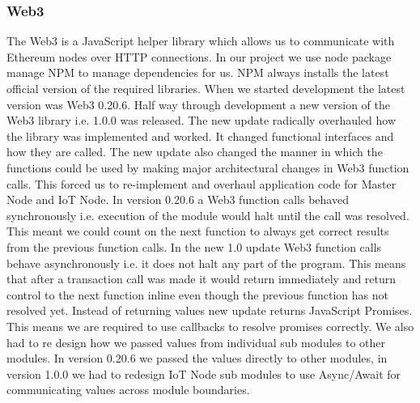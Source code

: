 \subsubsection{Web3}
The Web3 is a JavaScript helper library which allows us to communicate with Ethereum nodes over HTTP connections. In our project we use node package manage NPM to manage dependencies for us. NPM always installs the latest official version of the required libraries. When we started development the latest version was Web3 0.20.6. Half way through development a new version of the Web3 library i.e. 1.0.0 was released. The new update radically overhauled how the library was implemented and worked. It changed functional interfaces and how they are called. The new update also changed the manner in which the functions could be used by making major architectural changes in Web3 function calls. This forced us to re-implement and overhaul application code for Master Node and IoT Node. In version 0.20.6 a Web3 function calls behaved synchronously i.e. execution of the module would halt until the call was resolved. This meant we could count on the next function to always get correct results from the previous function calls. In the new 1.0 update Web3 function calls behave asynchronously i.e. it does not halt any part of the program. This means that after a transaction call was made it would return immediately and return control to the next function inline even though the previous function has not resolved yet. Instead of returning values new update returns JavaScript Promises. This means we are required to use callbacks to resolve promises correctly. We also had to re design how we passed values from individual sub modules to other modules. In version 0.20.6 we passed the values directly to other modules, in version 1.0.0 we had to redesign IoT Node sub modules to use Async/Await for communicating values across module boundaries.  

